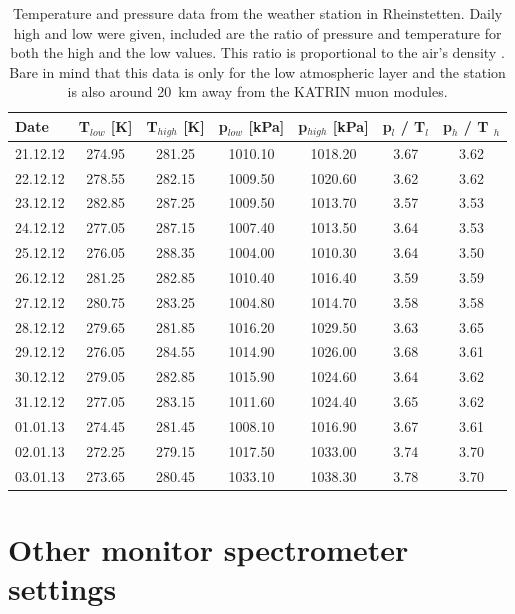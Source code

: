 \begin{table}[h]
	\begin{tabular}{| l | cc | cc| cc |}
	\hline
	Date & T$_{low}$ [K] & T$_{high}$ [K] & p$_{low}$ [kPa] & p$_{high}$ [kPa] & p$_l$ / T$_l$ & p$_h$ / T $_h$ \\
	\hline
	21.12.12 & 274.95 & 281.25 & 1010.10 & 1018.20 & 3.67 & 3.62\\
	22.12.12 & 278.55 & 282.15 & 1009.50 & 1020.60 & 3.62 & 3.62\\
	23.12.12 & 282.85 & 287.25 & 1009.50 & 1013.70 & 3.57 & 3.53\\
	24.12.12 & 277.05 & 287.15 & 1007.40 & 1013.50 & 3.64 & 3.53\\
	25.12.12 & 276.05 & 288.35 & 1004.00 & 1010.30 & 3.64 & 3.50\\
	26.12.12 & 281.25 & 282.85 & 1010.40 & 1016.40 & 3.59 & 3.59\\
	27.12.12 & 280.75 & 283.25 & 1004.80 & 1014.70 & 3.58 & 3.58\\
	28.12.12 & 279.65 & 281.85 & 1016.20 & 1029.50 & 3.63 & 3.65\\
	29.12.12 & 276.05 & 284.55 & 1014.90 & 1026.00 & 3.68 & 3.61\\
	30.12.12 & 279.05 & 282.85 & 1015.90 & 1024.60 & 3.64 & 3.62\\
	31.12.12 & 277.05 & 283.15 & 1011.60 & 1024.40 & 3.65 & 3.62\\
	01.01.13 & 274.45 & 281.45 & 1008.10 & 1016.90 & 3.67 & 3.61\\
	02.01.13 & 272.25 & 279.15 & 1017.50 & 1033.00 & 3.74 & 3.70\\
	03.01.13 & 273.65 & 280.45 & 1033.10 & 1038.30 & 3.78 & 3.70\\
	\hline
	
	\end{tabular}
	\caption[Temperature and pressure Rheinstetten]{Temperature and pressure data from the weather station in Rheinstetten. Daily high and low were given, included are the ratio of pressure and temperature for both the high and the low values. This ratio is proportional to the air's density . Bare in mind that this data is only for the low atmospheric layer and the station is also around \SI{20}{\kilo\meter} away  from the KATRIN muon modules.}
	\label{fig:weatherData}
\end{table}

\clearpage


\section{Other monitor spectrometer settings}
\label{ch:appendix:sec:monSpec}

